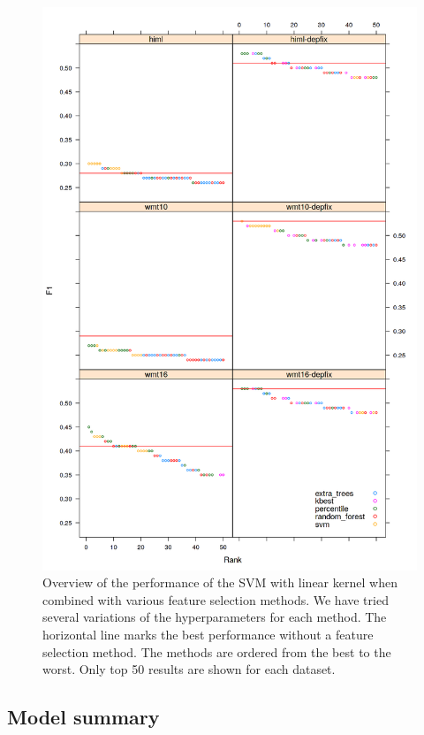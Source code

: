 \begin{figure}
\centering
  \includegraphics[scale=0.7]{wf-sel}
  \caption{
    Overview of the performance of the SVM with linear kernel when combined with various feature selection methods.
We have tried several variations of the hyperparameters
for each method. The horizontal line marks the best performance without
a feature selection method. The methods are ordered from the best to the worst. Only top 50 results
are shown for each dataset.
}
  \label{wf-sel}
\end{figure}


\subsection{Model summary}



